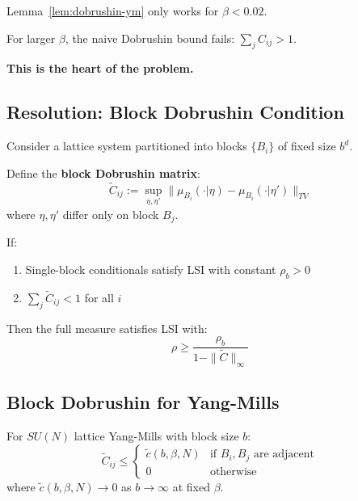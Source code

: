Lemma~\ref{lem:dobrushin-ym} only works for $\beta < 0.02$.

For larger $\beta$, the naive Dobrushin bound fails: $\sum_j C_{ij} > 1$.

\textbf{This is the heart of the problem.}

\subsection{Resolution: Block Dobrushin Condition}

\begin{theorem}
\label{thm:block-dobrushin}
Consider a lattice system partitioned into blocks $\{B_i\}$ of fixed size $b^d$.

Define the \textbf{block Dobrushin matrix}:
\[
\tilde{C}_{ij} := \sup_{\eta, \eta'} \|\mu_{B_i}(\cdot | \eta) - \mu_{B_i}(\cdot | \eta')\|_{TV}
\]
where $\eta, \eta'$ differ only on block $B_j$.

If:
\begin{enumerate}
\item Single-block conditionals satisfy LSI with constant $\rho_b > 0$
\item $\sum_j \tilde{C}_{ij} < 1$ for all $i$
\end{enumerate}

Then the full measure satisfies LSI with:
\[
\rho \geq \frac{\rho_b}{1 - \|\tilde{C}\|_\infty}
\]
\end{theorem}

\subsection{Block Dobrushin for Yang-Mills}

\begin{lemma}
\label{lem:block-dobrushin-ym}
For $SU(N)$ lattice Yang-Mills with block size $b$:
\[
\tilde{C}_{ij} \leq \begin{cases}
\tilde{c}(b, \beta, N) & \text{if } B_i, B_j \text{ are adjacent} \\
0 & \text{otherwise}
\end{cases}
\]
where $\tilde{c}(b, \beta, N) \to 0$ as $b \to \infty$ at fixed $\beta$.
\end{lemma}

